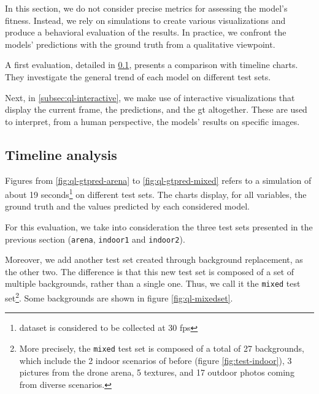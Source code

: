 In this section, we do not consider precise metrics for assessing the model's fitness. Instead, we rely on simulations to create various visualizations and produce a behavioral evaluation of the results. In practice, we confront the models' predictions with the ground truth from a qualitative viewpoint.

A first evaluation, detailed in \ref{subsec:ql-timeline}, presents a comparison with timeline charts. They investigate the general trend of each model on different test sets.

Next, in \ref{subsec:ql-interactive}, we make use of interactive visualizations that display the current frame, the predictions, and the \gls{gt} altogether. These are used to interpret, from a human perspective, the models' results on specific images.



\subsection{Timeline analysis}
\label{subsec:ql-timeline}

Figures from \ref{fig:ql-gtpred-arena} to \ref{fig:ql-gtpred-mixed} refers to a simulation of about 19 seconds\footnote{dataset is considered to be collected at 30 \gls{fps}} on different test sets. The charts display, for all variables, the ground truth and the values predicted by each considered model.

For this evaluation, we take into consideration the three test sets presented in the previous section (\texttt{arena}, \texttt{indoor1} and \texttt{indoor2}).

Moreover, we add another test set created through background replacement, as the other two. The difference is that this new test set is composed of a set of multiple backgrounds, rather than a single one. Thus, we call it the \texttt{mixed} test set\footnote{More precisely, the \texttt{mixed} test set is composed of a total of 27 backgrounds, which include the 2 indoor scenarios of before (figure \ref{fig:test-indoor}), 3 pictures from the drone arena, 5 textures, and 17 outdoor photos coming from diverse scenarios.}. Some backgrounds are shown in figure \ref{fig:ql-mixedset}.

